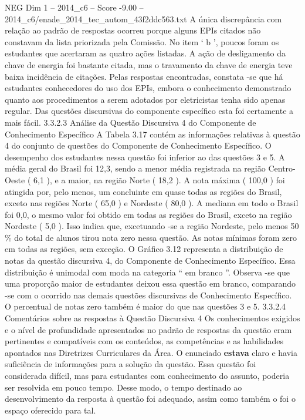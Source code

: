 \begin{textsample}{NEG Dim 1 – 2014\_c6 – Score -9.00 – 2014\_c6/enade\_2014\_tec\_autom\_43f2ddc563.txt}
A única discrepância com relação ao padrão de respostas ocorreu porque alguns EPIs citados não constavam da lista priorizada pela Comissão.
No item ‘ b ’, poucos foram os estudantes que acertaram as quatro ações listadas.
A ação de desligamento da chave de energia foi bastante citada, mas o travamento da chave de energia teve baixa incidência de citações.
Pelas respostas encontradas, constata -se que há estudantes conhecedores do uso dos EPIs, embora o conhecimento demonstrado quanto aos procedimentos a serem adotados por eletricistas tenha sido apenas regular.
Das questões discursivas do componente específico esta foi certamente a mais fácil. 3.3.2.3 Análise da Questão Discursiva 4 do Componente de Conhecimento Específico A Tabela 3.17 contém as informações relativas à questão 4 do conjunto de questões do Componente de Conhecimento Específico.
O desempenho dos estudantes nessa questão foi inferior ao das questões 3 e 5.
A média geral do Brasil foi 12,3, sendo a menor média registrada na região Centro-Oeste ( 6,1 ), e a maior, na região Norte ( 18,2 ).
A nota máxima ( 100,0 ) foi atingida por, pelo menos, um concluinte em quase todas as regiões do Brasil, exceto nas regiões Norte ( 65,0 ) e Nordeste ( 80,0 ).
A mediana em todo o Brasil foi 0,0, o mesmo valor foi obtido em todas as regiões do Brasil, exceto na região Nordeste ( 5,0 ).
Isso indica que, excetuando -se a região Nordeste, pelo menos 50 \% do total de alunos tirou nota zero nessa questão.
As notas mínimas foram zero em todas as regiões, sem exceção.
O Gráfico 3.12 representa a distribuição de notas da questão discursiva 4, do Componente de Conhecimento Específico.
Essa distribuição é unimodal com moda na categoria “ em branco ”.
Observa -se que uma proporção maior de estudantes deixou essa questão em branco, comparando -se com o ocorrido nas demais questões discursivas de Conhecimento Específico.
O percentual de notas zero também é maior do que nas questões 3 e 5. 3.3.2.4 Comentários sobre as respostas à Questão Discursiva 4 Os conhecimentos exigidos e o nível de profundidade apresentados no padrão de respostas da questão eram pertinentes e compatíveis com os conteúdos, as competências e as habilidades apontados nas Diretrizes Curriculares da Área.
O enunciado \textbf{estava} claro e havia suficiência de informações para a solução da questão.
Essa questão foi considerada difícil, mas para estudantes com conhecimento do assunto, poderia ser resolvida em pouco tempo.
Desse modo, o tempo destinado ao desenvolvimento da resposta à questão foi adequado, assim como também o foi o espaço oferecido para tal.

\end{textsample}
